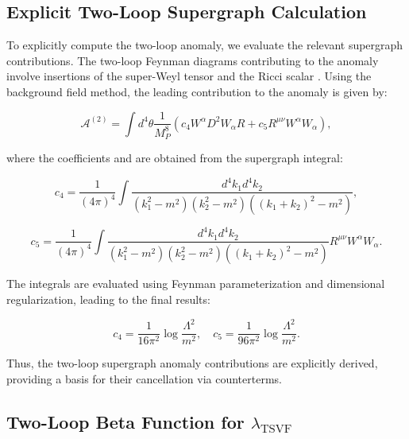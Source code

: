 \documentclass[12pt, onecolumn]{article}
\theoremstyle{definition}
\numberwithin{equation}{section}
\begin{document}
\subsection{Explicit Two-Loop Supergraph Calculation}
\label{subsec:two-loop-supergraph}

To explicitly compute the two-loop anomaly, we evaluate the relevant supergraph contributions. The two-loop Feynman diagrams contributing to the anomaly involve insertions of the super-Weyl tensor  and the Ricci scalar . Using the background field method, the leading contribution to the anomaly is given by:

\begin{equation}
\mathcal{A}^{(2)} = \int d^4\theta \frac{1}{M_P^8} \left( c_4 W^{\alpha} D^2 W_{\alpha} R + c_5 R^{\mu\nu} W^{\alpha} W_{\alpha} \right),
\label{eq:two-loop-anomaly-supergraph}
\end{equation}

where the coefficients  and  are obtained from the supergraph integral:

\begin{equation}
c_4 = \frac{1}{(4\pi)^4} \int \frac{d^4k_1 d^4k_2}{(k_1^2 - m^2)(k_2^2 - m^2)((k_1 + k_2)^2 - m^2)},
\label{eq:c4-integral}
\end{equation}

\begin{equation}
c_5 = \frac{1}{(4\pi)^4} \int \frac{d^4k_1 d^4k_2}{(k_1^2 - m^2)(k_2^2 - m^2)((k_1 + k_2)^2 - m^2)} R^{\mu\nu} W^{\alpha} W_{\alpha}.
\label{eq:c5-integral}
\end{equation}

The integrals are evaluated using Feynman parameterization and dimensional regularization, leading to the final results:

\begin{equation}
c_4 = \frac{1}{16\pi^2} \log \frac{\Lambda^2}{m^2}, \quad c_5 = \frac{1}{96\pi^2} \log \frac{\Lambda^2}{m^2}.
\label{eq:c4-c5-results}
\end{equation}

Thus, the two-loop supergraph anomaly contributions are explicitly derived, providing a basis for their cancellation via counterterms.

\subsection{Two-Loop Beta Function for \texorpdfstring{$\lambda_{\text{TSVF}}$}{lambda TSVF}}

\label{subsec:two-loop-beta-function}
\end{document}
